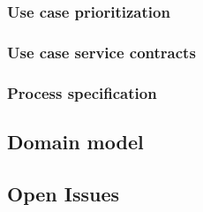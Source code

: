 \documentclass{article}
\begin{document}
		\subsubsection{Use case prioritization}
		\subsubsection{Use case service contracts}
		\subsubsection{Process specification}
	
	\subsection{Domain model}
	\subsection{Open Issues}


	
\end{document}
